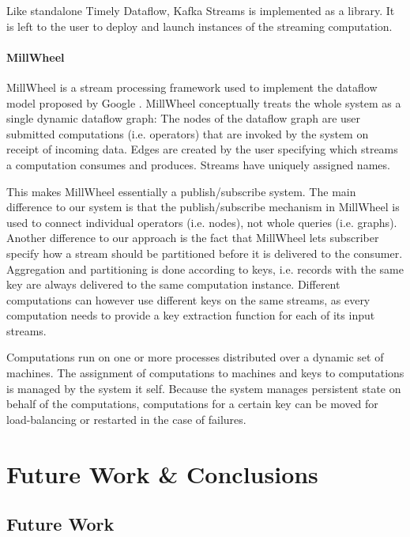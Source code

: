 Like standalone Timely Dataflow, Kafka Streams is implemented as a library. It
is left to the user to deploy and launch instances of the streaming computation.

\subsubsection{MillWheel}

MillWheel \cite{millwheel} is a stream processing framework used to implement
the dataflow model proposed by Google \cite{google}. MillWheel conceptually
treats the whole system as a single dynamic dataflow graph: The nodes of the
dataflow graph are user submitted computations (i.e. operators) that are
invoked by the system on receipt of incoming data. Edges are created by the
user specifying which streams a computation consumes and produces. Streams
have uniquely assigned names.

This makes MillWheel essentially a publish/subscribe system. The main difference
to our system is that the publish/subscribe mechanism in MillWheel is used to
connect individual operators (i.e. nodes), not whole queries (i.e. graphs).
Another difference to our approach is the fact that MillWheel lets subscriber
specify how a stream should be partitioned before it is delivered to the consumer.
Aggregation and partitioning is done according to keys, i.e. records with the
same key are always delivered to the same computation instance. Different
computations can however use different keys on the same streams, as every computation
needs to provide a key extraction function for each of its input streams.

Computations run on one or more processes distributed over a dynamic set of
machines. The assignment of computations to machines and keys to computations
is managed by the system it self. Because the system manages persistent state
on behalf of the computations, computations for a certain key can be moved
for load-balancing or restarted in the case of failures.

\chapter{Future Work \& Conclusions} \label{ch:conclusions}

\section{Future Work}



